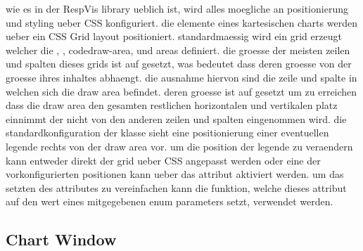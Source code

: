 wie es in der RespVis library ueblich ist, wird alles moegliche an positionierung und styling ueber CSS konfiguriert.
die elemente eines kartesischen charts werden ueber ein CSS Grid layout positioniert.
standardmaessig wird ein grid erzeugt welcher die , , code{draw-area}, und  areas definiert.
die groesse der meisten zeilen und spalten dieses grids ist auf  gesetzt, was bedeutet dass deren groesse von der groesse ihres inhaltes abhaengt. 
die ausnahme hiervon sind die zeile und spalte in welchen sich die draw area befindet.
deren groesse ist auf  gesetzt um zu erreichen dass die draw area den gesamten restlichen horizontalen und vertikalen platz einnimmt der nicht von den anderen zeilen und spalten eingenommen wird.
die standardkonfiguration der  klasse sieht eine positionierung einer eventuellen legende rechts von der draw area vor.
um die position der legende zu veraendern kann entweder direkt der grid ueber CSS angepasst werden oder eine der vorkonfigurierten positionen kann ueber das  attribut aktiviert werden.
um das setzten des  attributes zu vereinfachen kann die  funktion, welche dieses attribut auf den wert eines mitgegebenen  enum parameters setzt, verwendet werden.


\subsection{Chart Window}



